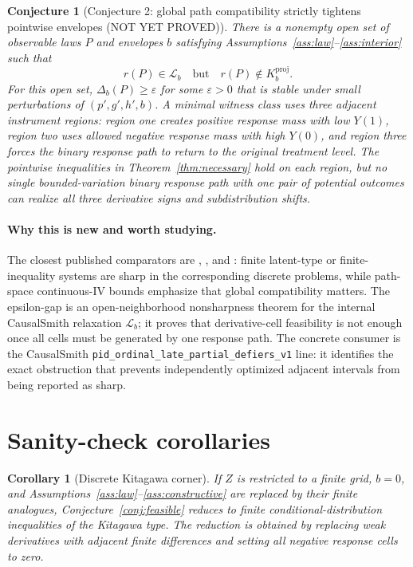 \documentclass[11pt]{article}
\theoremstyle{definition}
\theoremstyle{plain}
\newtheorem{conjecture}{Conjecture}
\newtheorem{corollary}{Corollary}
\theoremstyle{remark}
\begin{document}
\begin{conjecture}[Conjecture 2: global path compatibility strictly tightens pointwise envelopes (NOT YET PROVED)]\label{conj:strict}
There is a nonempty open set of observable laws \(P\) and envelopes \(b\) satisfying Assumptions~\ref{ass:law}--\ref{ass:interior} such that
\[
r(P)\in\mathcal L_b\quad\text{but}\quad r(P)\notin K_b^{\mathrm{proj}} .
\]
For this open set, \(\Delta_b(P)\ge\varepsilon\) for some \(\varepsilon>0\) that is stable under small perturbations of \((p',g',h',b)\).  A minimal witness class uses three adjacent instrument regions: region one creates positive response mass with low \(Y(1)\), region two uses allowed negative response mass with high \(Y(0)\), and region three forces the binary response path to return to the original treatment level.  The pointwise inequalities in Theorem~\ref{thm:necessary} hold on each region, but no single bounded-variation binary response path with one pair of potential outcomes can realize all three derivative signs and subdistribution shifts.
\end{conjecture}
\paragraph{Why this is new and worth studying.}
The closest published comparators are \citet{BalkePearl1997}, \citet{Kitagawa2015}, and \citet{Gunsilius2019}: finite latent-type or finite-inequality systems are sharp in the corresponding discrete problems, while path-space continuous-IV bounds emphasize that global compatibility matters.  The epsilon-gap is an open-neighborhood nonsharpness theorem for the internal CausalSmith relaxation \(\mathcal L_b\); it proves that derivative-cell feasibility is not enough once all cells must be generated by one response path.  The concrete consumer is the CausalSmith \texttt{pid\_ordinal\_late\_partial\_defiers\_v1} line: it identifies the exact obstruction that prevents independently optimized adjacent intervals from being reported as sharp.

\section{Sanity-check corollaries}
\begin{corollary}[Discrete Kitagawa corner]\label{cor:kitagawa}
If \(Z\) is restricted to a finite grid, \(b=0\), and Assumptions~\ref{ass:law}--\ref{ass:constructive} are replaced by their finite analogues, Conjecture~\ref{conj:feasible} reduces to finite conditional-distribution inequalities of the Kitagawa type.  The reduction is obtained by replacing weak derivatives with adjacent finite differences and setting all negative response cells to zero.
\end{corollary}
\end{document}
